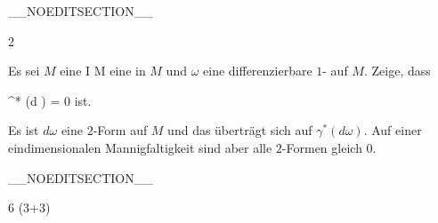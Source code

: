 __NOEDITSECTION__

{2}

{

Es sei $M$ eine
\maabb {\gamma} { I } { M
} {}
eine
in $M$ und $\omega$ eine differenzierbare
$1$-
auf $M$. Zeige, dass

\mavergleichskettedisp
{\vergleichskette
{ \gamma^* (d \omega)
}
{ =} { 0
}
{ } {
}
{ } {
}
{ } {
}
}
{}{}{}
ist.

}
{

Es ist $d \omega$ eine $2$-Form auf $M$  und das überträgt sich auf $\gamma^*(d \omega)$. Auf einer eindimensionalen Mannigfaltigkeit sind aber  alle $2$-Formen gleich $0$.

 }

__NOEDITSECTION__

{6 (3+3)}

